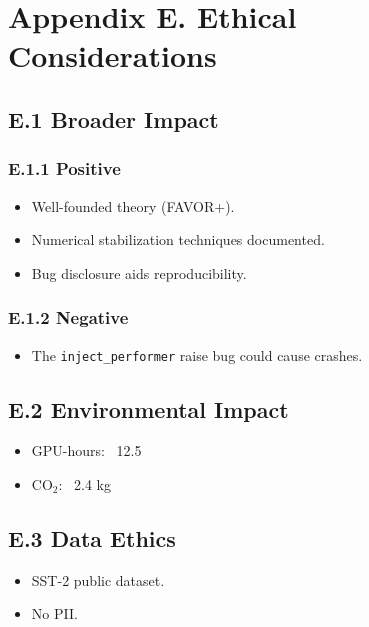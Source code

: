 
\section{Appendix E. Ethical Considerations}

\subsection{E.1 Broader Impact}

\subsubsection{E.1.1 Positive}

\begin{itemize}
\item Well-founded theory (FAVOR+).
\item Numerical stabilization techniques documented.
\item Bug disclosure aids reproducibility.

\end{itemize}
\subsubsection{E.1.2 Negative}

\begin{itemize}
\item The \texttt{inject\_performer} raise bug could cause crashes.

\end{itemize}
\subsection{E.2 Environmental Impact}

\begin{itemize}
\item GPU-hours: ~12.5
\item CO$_2$: ~2.4 kg

\end{itemize}
\subsection{E.3 Data Ethics}

\begin{itemize}
\item SST-2 public dataset.
\item No PII.

\end{itemize}

